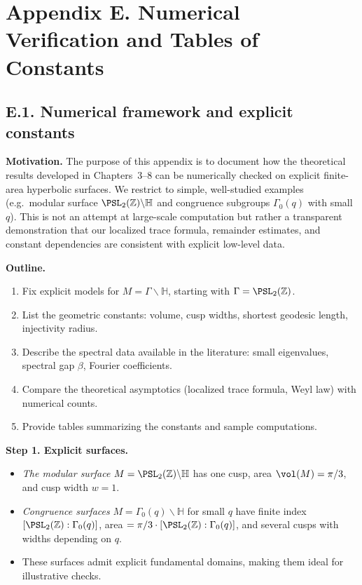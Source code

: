 \section*{Appendix E. Numerical Verification and Tables of Constants}

\subsection*{E.1. Numerical framework and explicit constants}

\noindent \textbf{Motivation.}
The purpose of this appendix is to document how the theoretical results developed in Chapters~3--8 can be numerically checked on explicit finite-area hyperbolic surfaces. 
We restrict to simple, well-studied examples (e.g.~modular surface $\PSL_2(\mathbb Z)\backslash\mathbb H$ and congruence subgroups $\Gamma_0(q)$ with small $q$). 
This is not an attempt at large-scale computation but rather a transparent demonstration that our localized trace formula, remainder estimates, and constant dependencies are consistent with explicit low-level data.

\medskip
\noindent \textbf{Outline.}
\begin{enumerate}
  \item Fix explicit models for $M=\Gamma\backslash\mathbb H$, starting with $\Gamma=\PSL_2(\mathbb Z)$.
  \item List the geometric constants: volume, cusp widths, shortest geodesic length, injectivity radius.
  \item Describe the spectral data available in the literature: small eigenvalues, spectral gap $\beta$, Fourier coefficients.
  \item Compare the theoretical asymptotics (localized trace formula, Weyl law) with numerical counts.
  \item Provide tables summarizing the constants and sample computations.
\end{enumerate}

\medskip
\noindent \textbf{Step 1. Explicit surfaces.}
\begin{itemize}
  \item \emph{The modular surface} $M=\PSL_2(\mathbb Z)\backslash\mathbb H$ has one cusp, area $\vol(M)=\pi/3$, and cusp width $w=1$.
  \item \emph{Congruence surfaces} $M=\Gamma_0(q)\backslash\mathbb H$ for small $q$ have finite index $[\PSL_2(\mathbb Z):\Gamma_0(q)]$, area $=\pi/3\cdot [\PSL_2(\mathbb Z):\Gamma_0(q)]$, and several cusps with widths depending on $q$.
  \item These surfaces admit explicit fundamental domains, making them ideal for illustrative checks.
\end{itemize}

